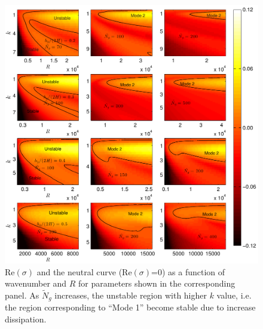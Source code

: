 \documentclass[12pt]{report}   %
\newcommand{\Rey}{{R}}
\newcommand{\Ndg}{\tilde{N}_g}
\begin{document}
\begin{figure}
\centerline{ \includegraphics{IsotropicDragAll_imgsc4} }
\caption{
$\text{Re}(\sigma)$ and the neutral curve ($\text{Re}(\sigma)$=0) as a function of wavenumber and $\Rey$ for parameters shown in the corresponding panel.  
As $\Ndg$ increases, the unstable region with higher $k$ value, i.e. the region corresponding to ``Mode 1'' become stable due to increase dissipation.
}
\label{IsotropicK_Re_sigma_set3}
\end{figure}
\end{document}
